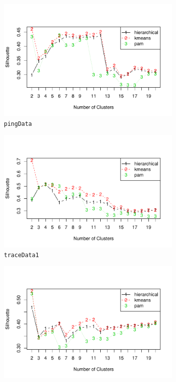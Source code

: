 \iffalse
\begin{figure}[!htb]
    \centering
    \begin{subfigure}[b]{.7\textwidth}
	\includegraphics[width=\textwidth]{gfx/chap3/pingSil.pdf}
	\caption{\scriptsize \texttt{pingData}}
	\label{fig:pingSil}
	\end{subfigure}
	\begin{subfigure}[b]{.7\textwidth}
	\includegraphics[width=\textwidth]{gfx/chap3/traceSil1.pdf}
	\caption{\scriptsize \texttt{traceData1}}
	\label{fig:traceSil1}
	\end{subfigure}
	\begin{subfigure}[b]{.7\textwidth}
	\includegraphics[width=\textwidth]{gfx/chap3/traceSil2.pdf}

\end{subfigure}
\end{figure}
